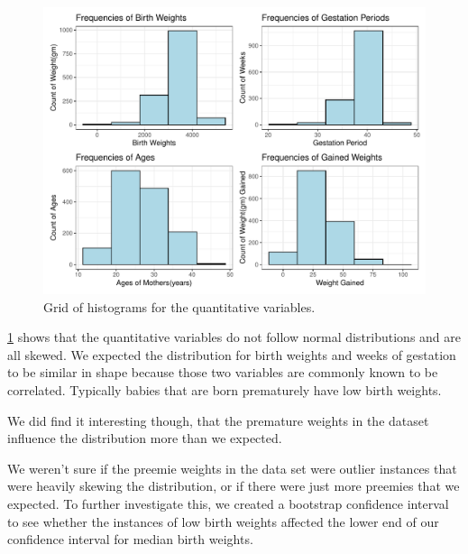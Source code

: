 \documentclass{article}\usepackage[]{graphicx}\usepackage[]{xcolor}
\makeatletter
\def\maxwidth{ %
  \ifdim\Gin@nat@width>\linewidth
    \linewidth
  \else
    \Gin@nat@width
  \fi
}
\newenvironment{knitrout}{}{} %
\makeatother
\begin{document}
\begin{enumerate}[a.]
\begin{figure}[H]
\centering
\begin{knitrout}
\color{fgcolor}
\includegraphics[width=\maxwidth]{figure/unnamed-chunk-4-1} 
\end{knitrout}
\caption{Grid of histograms for the quantitative variables.}
\label{HistogramSummary}
\end{figure}

\ref{HistogramSummary} shows that the quantitative variables do not follow normal distributions and are all skewed. We expected the distribution for birth weights and weeks of gestation to be similar in shape because those two variables are commonly known to be correlated. Typically babies that are born prematurely have low birth weights. 

We did find it interesting though, that the premature weights in the dataset influence the distribution more than we expected. 

We weren't sure if the preemie weights in the data set were outlier instances that were heavily skewing the distribution, or if there were just more preemies that we expected. To further investigate this, we created a bootstrap confidence interval to see whether the instances of low birth weights affected the lower end of our confidence interval for median birth weights. 


\end{enumerate}
\end{document}

